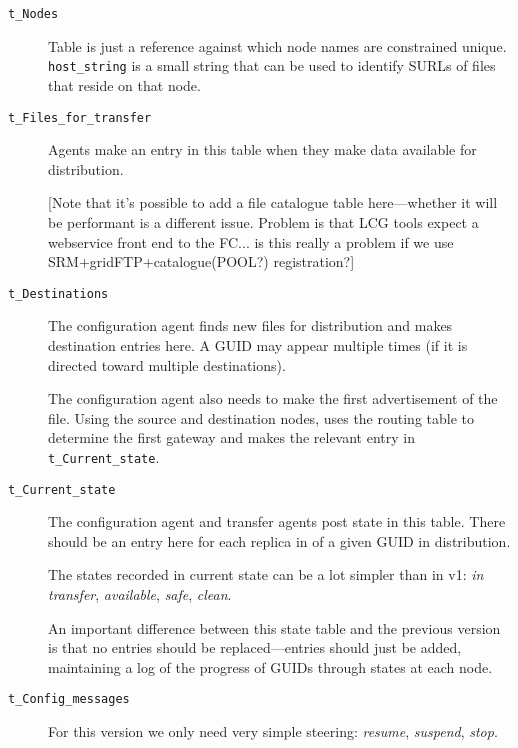 \documentclass{cmspaper}
\begin{document}
\begin{description}
  \item [\texttt{t\_Nodes}]\mbox{}

    Table is just a reference against which node names are constrained
    unique.  \verb|host_string| is a small string that can be used to
    identify SURLs of files that reside on that node.

  \item [\texttt{t\_Files\_for\_transfer}]\mbox{}

    Agents make an entry in this table when they make data available
    for distribution.

    [Note that it's possible to add a file catalogue table
    here---whether it will be performant is a different issue.
    Problem is that LCG tools expect a webservice front end to the
    FC... is this really a problem if we use
    SRM+gridFTP+catalogue(POOL?) registration?]

  \item [\texttt{t\_Destinations}]\mbox{}

    The configuration agent finds new files for distribution and makes
    destination entries here.  A GUID may appear multiple times (if it
    is directed toward multiple destinations).

    The configuration agent also needs to make the first advertisement
    of the file.  Using the source and destination nodes, uses the
    routing table to determine the first gateway and makes the
    relevant entry in \texttt{t\_Current\_state}.

  \item [\texttt{t\_Current\_state}]\mbox{}

    The configuration agent and transfer agents post state in this
    table. There should be an entry here for each replica in of a
    given GUID in distribution.

    The states recorded in current state can be a lot simpler than in
    v1: {\em in transfer}, {\em available}, {\em safe}, {\em clean}.

    An important difference between this state table and the previous
    version is that no entries should be replaced---entries should just
    be added, maintaining a log of the progress of GUIDs through
    states at each node.

  \item [\texttt{t\_Config\_messages}]\mbox{}

    For this version we only need very simple steering: {\em resume},
    {\em suspend}, {\em stop}.


\end{description}
\end{document}
